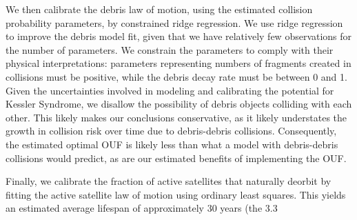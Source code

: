 \documentclass[9pt,twocolumn,twoside,lineno]{pnas-new}
\begin{document}
{	We then calibrate the debris law of motion, using the estimated collision probability parameters, by constrained ridge regression. We use ridge regression to improve the debris model fit, given that we have relatively few observations for the number of parameters. We constrain the parameters to comply with their physical interpretations: parameters representing numbers of fragments created in collisions must be positive, while the debris decay rate must be between 0 and 1. Given the uncertainties involved in modeling and calibrating the potential for Kessler Syndrome, we disallow the possibility of debris objects colliding with each other. This likely makes our conclusions conservative, as it likely understates the growth in collision risk over time due to debris-debris collisions. Consequently, the estimated optimal OUF is likely less than what a model with debris-debris collisions would predict, as are our estimated benefits of implementing the OUF.
	
	Finally, we calibrate the fraction of active satellites that naturally deorbit by fitting the active satellite law of motion using ordinary least squares. This yields an estimated average lifespan of approximately 30 years (the 3.3%
	
}
\end{document}

